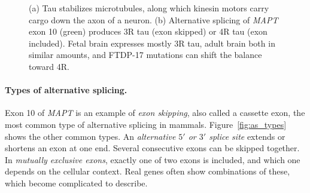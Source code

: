 \begin{figure}[!htbp]
  \caption{(a) Tau stabilizes microtubules, along which kinesin motors carry cargo down the axon of a neuron. (b) Alternative splicing of \textit{MAPT} exon 10 (green) produces 3R tau (exon skipped) or 4R tau (exon included). Fetal brain expresses mostly 3R tau, adult brain both in similar amounts, and FTDP-17 mutations can shift the balance toward 4R.}
  \label{fig:tau}
\end{figure}

\paragraph{Types of alternative splicing.} Exon 10 of \textit{MAPT} is an example of \emph{exon skipping}, also called a cassette exon, the most common type of alternative splicing in mammals. Figure~\ref{fig:as_types} shows the other common types. An \emph{alternative $5'$ or $3'$ splice site} extends or shortens an exon at one end. Several consecutive exons can be skipped together. In \emph{mutually exclusive exons}, exactly one of two exons is included, and which one depends on the cellular context. Real genes often show combinations of these, which become complicated to describe.

